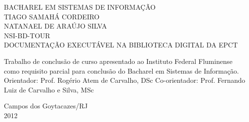 \begin{titlepage}
 \begin{figure}[ht]
 \centering
 \end{figure}
 \begin{center}
   {\large BACHAREL EM SISTEMAS DE INFORMAÇÃO} \\ [3.5cm]
   {\large TIAGO SAMAHÁ CORDEIRO} \\
   {\large NATANAEL DE ARAÚJO SILVA} \\ [4cm]
   {\large NSI-BD-TOUR}\\ [0.5cm]
   {\small DOCUMENTAÇÃO EXECUTÁVEL NA BIBLIOTECA DIGITAL DA EPCT} \\ [2cm]
   \hspace{.45\textwidth} %
   \begin{minipage}{0.53\textwidth}
   \begin{espacosimples}
      Trabalho de conclusão de curso apresentado ao Instituto Federal Fluminense como requisito parcial para conclusão do Bacharel em Sistemas de Informação.\\[1.5cm]
      Orientador: Prof. Rogério Atem de Carvalho, DSc
      Co-orientador: Prof. Fernando Luiz de Carvalho e Silva, MSc
    \end{espacosimples}
    \end{minipage}
   \vfill
   {\large Campos dos Goytacazes/RJ} \\
   {\large 2012}
 \end{center}
\end{titlepage}